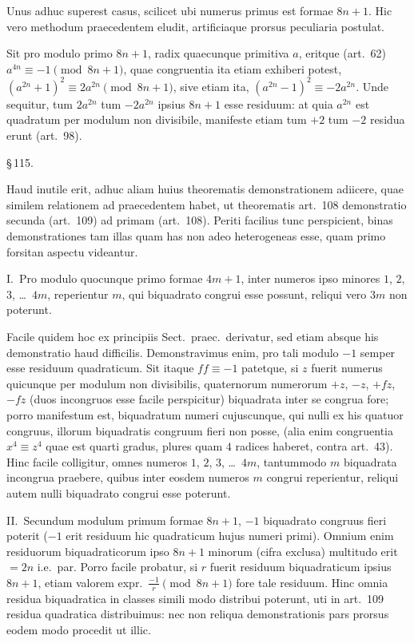 \documentclass[12pt,a4paper]{article}
\theoremstyle{plain}
\theoremstyle{definition}
\theoremstyle{remark}
\begin{document}
Unus adhuc superest casus, scilicet ubi numerus primus est formae $8n+1$. Hic vero methodum praecedentem eludit, artificiaque prorsus peculiaria postulat.

Sit pro modulo primo $8n+1$, radix quaecunque primitiva $a$, eritque (art.~62) $a^{4n} \equiv -1 \pmod{8n+1}$, quae congruentia ita etiam exhiberi potest, $(a^{2n} + 1)^2 \equiv 2a^{2n} \pmod{8n+1}$, sive etiam ita, $(a^{2n} - 1)^2 \equiv -2a^{2n}$. Unde sequitur, tum $2a^{2n}$ tum $-2a^{2n}$ ipsius $8n+1$ esse residuum: at quia $a^{2n}$ est quadratum per modulum non divisibile, manifeste etiam tum $+2$ tum $-2$ residua erunt (art.~98).

\begin{center}\S\,115.\end{center}

Haud inutile erit, adhuc aliam huius theorematis demonstrationem adiicere, quae similem relationem ad praecedentem habet, ut theorematis art.~108 demonstratio secunda (art.~109) ad primam (art.~108). Periti facilius tunc perspicient, binas demonstrationes tam illas quam has non adeo heterogeneas esse, quam primo forsitan aspectu videantur.

I.\ Pro modulo quocunque primo formae $4m+1$, inter numeros ipso minores $1$, $2$, $3$, \dots\ $4m$, reperientur $m$, qui biquadrato congrui esse possunt, reliqui vero $3m$ non poterunt.

Facile quidem hoc ex principiis Sect.\ praec.\ derivatur, sed etiam absque his demonstratio haud difficilis. Demonstravimus enim, pro tali modulo $-1$ semper esse residuum quadraticum. Sit itaque $ff \equiv -1$ patetque, si $z$ fuerit numerus quicunque per modulum non divisibilis, quaternorum numerorum $+z$, $-z$, $+fz$, $-fz$ (duos incongruos esse facile perspicitur) biquadrata inter se congrua fore; porro manifestum est, biquadratum numeri cujuscunque, qui nulli ex his quatuor congruus, illorum biquadratis congruum fieri non posse, (alia enim congruentia $x^4 \equiv z^4$ quae est quarti gradus, plures quam $4$ radices haberet, contra art.~43). Hinc facile colligitur, omnes numeros $1$, $2$, $3$, \dots\ $4m$, tantummodo $m$ biquadrata incongrua praebere, quibus inter eosdem numeros $m$ congrui reperientur, reliqui autem nulli biquadrato congrui esse poterunt.

II.\ Secundum modulum primum formae $8n+1$, $-1$ biquadrato congruus fieri poterit ($-1$ erit residuum hic quadraticum hujus numeri primi). Omnium enim residuorum biquadraticorum ipso $8n+1$ minorum (cifra exclusa) multitudo erit $= 2n$ i.e.\ par. Porro facile probatur, si $r$ fuerit residuum biquadraticum ipsius $8n+1$, etiam valorem expr.\ $\frac{-1}{r} \pmod{8n+1}$ fore tale residuum. Hinc omnia residua biquadratica in classes simili modo distribui poterunt, uti in art.~109 residua quadratica distribuimus: nec non reliqua demonstrationis pars prorsus eodem modo procedit ut illic.
\end{document}

